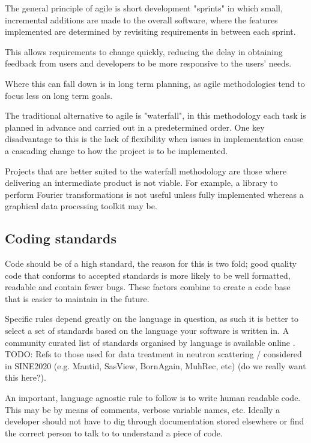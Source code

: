 \documentclass[jnr]{iosart2x}
\begin{document}
The general principle of agile is short development "sprints" in which small, incremental additions are made to the overall software, where the features implemented are determined by revisiting requirements in between each sprint.

This allows requirements to change quickly, reducing the delay in obtaining feedback from users and developers to be more responsive to the users' needs.

Where this can fall down is in long term planning, as agile methodologies tend to focus less on long term goals.

The traditional alternative to agile is "waterfall", in this methodology each task is planned in advance and carried out in a predetermined order.
One key disadvantage to this is the lack of flexibility when issues in implementation cause a cascading change to how the project is to be implemented.

Projects that are better suited to the waterfall methodology are those where delivering an intermediate product is not viable.
For example, a library to perform Fourier transformations is not useful unless fully implemented whereas a graphical data processing toolkit may be.

\subsection{Coding standards}
\label{Coding standards}

Code should be of a high standard, the reason for this is two fold; good quality code that conforms to accepted standards is more likely to be well formatted, readable and contain fewer bugs.
These factors combine to create a code base that is easier to maintain in the future.

Specific rules depend greatly on the language in question, as such it is better to select a set of standards based on the language your software is written in.
A community curated list of standards organised by language is available online \cite{Awesome_Guidelines}.
TODO: Refs to those used for data treatment in neutron scattering / considered in SINE2020 (e.g. Mantid, SasView, BornAgain, MuhRec, etc) (do we really want this here?).

An important, language agnostic rule to follow is to write human readable code.
This may be by means of comments, verbose variable names, etc.
Ideally a developer should not have to dig through documentation stored elsewhere or find the correct person to talk to to understand a piece of code.
\end{document}
